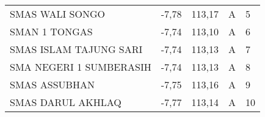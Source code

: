 \begin{table}[H]
\begin{adjustbox}{width=\columnwidth,center}
\begin{tabular}{lllcl}
SMAS   WALI SONGO                                                                          & -7,78                                                                                          & 113,17                                                                                          & A                                       & 5                                                                                  \\
\rowcolor[HTML]{D9E1F2} 
SMAN 1 TONGAS                                                                              & -7,74                                                                                          & 113,10                                                                                          & A                                       & 6                                                                                  \\
SMAS   ISLAM TAJUNG SARI                                                                   & -7,74                                                                                          & 113,13                                                                                          & A                                       & 7                                                                                  \\
\rowcolor[HTML]{D9E1F2} 
SMA NEGERI 1 SUMBERASIH                                                                    & -7,74                                                                                          & 113,13                                                                                          & A                                       & 8                                                                                  \\
SMAS   ASSUBHAN                                                                            & -7,75                                                                                          & 113,16                                                                                          & A                                       & 9                                                                                  \\
\rowcolor[HTML]{D9E1F2} 
SMAS DARUL AKHLAQ                                                                          & -7,77                                                                                          & 113,14                                                                                          & A                                       & 10                                                                                 \\

\end{tabular}
\end{adjustbox}
\end{table}
